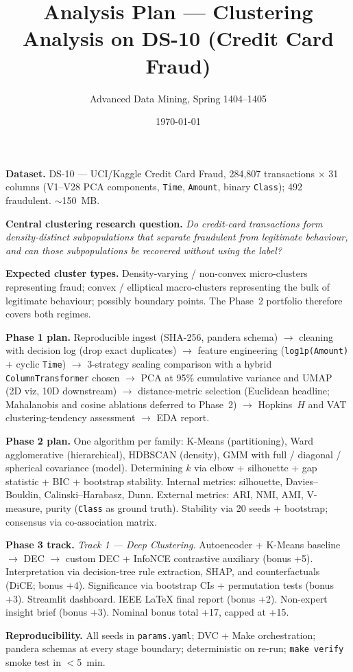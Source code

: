 \documentclass[11pt, a4paper]{article}
\title{\textbf{Analysis Plan — Clustering Analysis on DS-10 (Credit Card Fraud)}}
\author{Advanced Data Mining, Spring 1404--1405}
\date{\today}
\begin{document}
\maketitle

\textbf{Dataset.} DS-10 — UCI/Kaggle Credit Card Fraud, 284{,}807 transactions $\times$ 31 columns (V1--V28 PCA components, \texttt{Time}, \texttt{Amount}, binary \texttt{Class}); 492 fraudulent. $\sim$150~MB.

\textbf{Central clustering research question.} \emph{Do credit-card transactions form density-distinct subpopulations that separate fraudulent from legitimate behaviour, and can those subpopulations be recovered without using the label?}

\textbf{Expected cluster types.} Density-varying / non-convex micro-clusters representing fraud; convex / elliptical macro-clusters representing the bulk of legitimate behaviour; possibly boundary points. The Phase~2 portfolio therefore covers both regimes.

\textbf{Phase 1 plan.} Reproducible ingest (SHA-256, pandera schema) $\rightarrow$ cleaning with decision log (drop exact duplicates) $\rightarrow$ feature engineering (\texttt{log1p(Amount)} + cyclic \texttt{Time}) $\rightarrow$ 3-strategy scaling comparison with a hybrid \texttt{ColumnTransformer} chosen $\rightarrow$ PCA at 95\% cumulative variance and UMAP (2D viz, 10D downstream) $\rightarrow$ distance-metric selection (Euclidean headline; Mahalanobis and cosine ablations deferred to Phase~2) $\rightarrow$ Hopkins~$H$ and VAT clustering-tendency assessment $\rightarrow$ EDA report.

\textbf{Phase 2 plan.} One algorithm per family: K-Means (partitioning), Ward agglomerative (hierarchical), HDBSCAN (density), GMM with full / diagonal / spherical covariance (model). Determining $k$ via elbow + silhouette + gap statistic + BIC + bootstrap stability. Internal metrics: silhouette, Davies--Bouldin, Calinski--Harabasz, Dunn. External metrics: ARI, NMI, AMI, V-measure, purity (\texttt{Class} as ground truth). Stability via 20 seeds + bootstrap; consensus via co-association matrix.

\textbf{Phase 3 track.} \emph{Track 1 --- Deep Clustering.} Autoencoder + K-Means baseline $\rightarrow$ DEC $\rightarrow$ custom DEC + InfoNCE contrastive auxiliary (bonus +5). Interpretation via decision-tree rule extraction, SHAP, and counterfactuals (DiCE; bonus +4). Significance via bootstrap CIs + permutation tests (bonus +3). Streamlit dashboard. IEEE LaTeX final report (bonus +2). Non-expert insight brief (bonus +3). Nominal bonus total +17, capped at +15.

\textbf{Reproducibility.} All seeds in \texttt{params.yaml}; DVC + Make orchestration; pandera schemas at every stage boundary; deterministic on re-run; \texttt{make verify} smoke test in $<$5~min.
\end{document}
